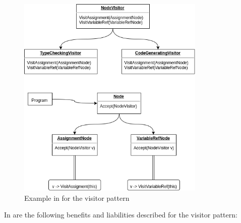 \documentclass{llncs}
\begin{document}
\begin{figure}[h]
	\centering
	\includegraphics[width=0.8\textwidth]{img/Visitor-Pattern-Example}
	\caption{Example in \cite{GHJV94} for the visitor pattern}
	\label{fig:visitor-pattern}
\end{figure} 

In \cite{GHJV94} are the following benefits and liabilities described for the visitor pattern:
\end{document}
